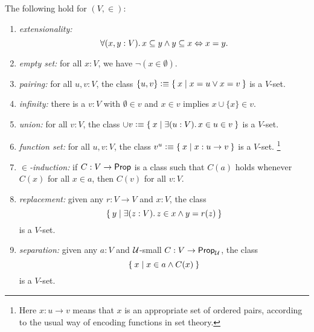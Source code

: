 \begin{thm}\label{thm:VisCST}
  The following hold for $(V, {\in})$:
  \begin{enumerate}
  \item \emph{extensionality:}
    \begin{equation*}
      \fall{x, y : V} x \subseteq y \land y \subseteq x \Leftrightarrow x = y.
    \end{equation*}
     \item \emph{empty set:} for all $x:V$, we have $\neg (x\in \emptyset)$.
    \item \emph{pairing:} for all $u, v:V$, the class $\{u, v\} \vcentcolon\equiv \Set{ x | x = u \vee x = v}$ is a $V$-set.
    \item \emph{infinity:}  there is a $v:V$ with $\emptyset\in v$ and $x\in v$ implies $x\cup \{x\}\in v$.
  \item \emph{union:} for all $v:V$, the class $\cup v\defeq \setof{ x | \exis{u:V} x \in u \in v}$ is a $V$-set.
    \item \emph{function set:} for all $u, v:V$, the class $v^u \vcentcolon\equiv \Set{ x | x : u\to v}$ is a $V$-set.%
      \footnote{Here $x:u\to v$ means that $x$ is an appropriate set of ordered pairs, according to the usual way of encoding functions in set theory.}
   \item \emph{$\in$-induction:} if $C : V \to \mathsf{Prop}$ is a class such that $C(a)$ holds whenever $C(x)$ for all $x\in a$, then $C(v)$ for all $v:V$.
     \item \emph{replacement:} given any $r : V \to V$ and $x : V$, the class
       \begin{equation*}
         \setof{ y | \exis{z : V} z \in x \land y = r(z)}
       \end{equation*}
       is a $V$-set.
   \item \emph{separation:}  given any $a : V$ and $\mathcal{U}$-small $C : V \to \mathsf{Prop}_\mathcal{U}$, the class
     \begin{equation*}
       \Set{ x | x \in a \land C(x)}
     \end{equation*}
     is a $V$-set.
  \end{enumerate}
\end{thm}


